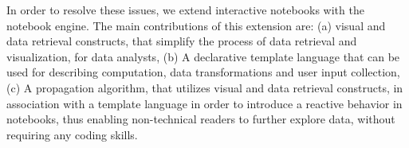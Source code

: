 In order to resolve these issues, we extend interactive notebooks with the  {\projname} notebook engine. The main contributions of this extension are: (a) visual and data retrieval constructs, that simplify the process of data retrieval and visualization, for data analysts, (b) A declarative template language that can be used for describing computation, data transformations and user input collection, (c) A propagation algorithm, that utilizes visual and data retrieval constructs, in association with a template language in order to introduce a reactive behavior in notebooks, thus enabling non-technical readers to further explore data, without requiring any coding skills. 


